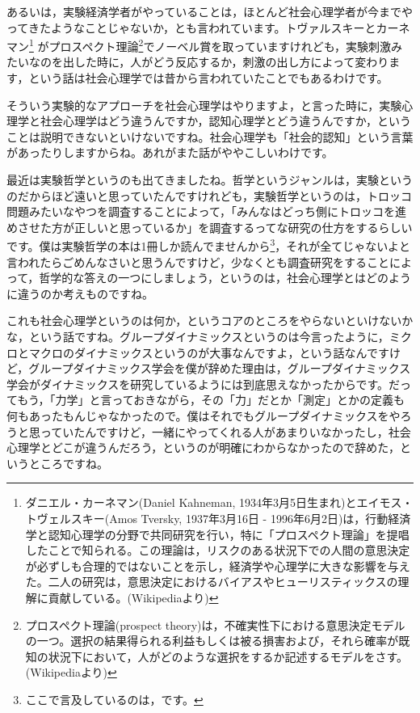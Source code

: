 \documentclass{ltjsbook}
\begin{document}
あるいは，実験経済学者がやっていることは，ほとんど社会心理学者が今までやってきたようなことじゃないか，とも言われています。トヴァルスキーとカーネマン\footnote{ダニエル・カーネマン(Daniel Kahneman, 1934年3月5日生まれ)とエイモス・トヴェルスキー(Amos Tversky, 1937年3月16日 - 1996年6月2日)は，行動経済学と認知心理学の分野で共同研究を行い，特に「プロスペクト理論」を提唱したことで知られる。この理論は，リスクのある状況下での人間の意思決定が必ずしも合理的ではないことを示し，経済学や心理学に大きな影響を与えた。二人の研究は，意思決定におけるバイアスやヒューリスティックスの理解に貢献している。(Wikipediaより)}
がプロスペクト理論\footnote{プロスペクト理論(prospect theory)は，不確実性下における意思決定モデルの一つ。選択の結果得られる利益もしくは被る損害および，それら確率が既知の状況下において，人がどのような選択をするか記述するモデルをさす。(Wikipediaより)}でノーベル賞を取っていますけれども，実験刺激みたいなのを出した時に，人がどう反応するか，刺激の出し方によって変わります，という話は社会心理学では昔から言われていたことでもあるわけです。

そういう実験的なアプローチを社会心理学はやりますよ，と言った時に，実験心理学と社会心理学はどう違うんですか，認知心理学とどう違うんですか，ということは説明できないといけないですね。社会心理学も「社会的認知」という言葉があったりしますからね。あれがまた話がややこしいわけです。

最近は実験哲学というのも出てきましたね。哲学というジャンルは，実験というのだからほど遠いと思っていたんですけれども，実験哲学というのは，トロッコ問題みたいなやつを調査することによって，「みんなはどっち側にトロッコを進めさせた方が正しいと思っているか」を調査するってな研究の仕方をするらしいです。僕は実験哲学の本は1冊しか読んでませんから\footnote{ここで言及しているのは，\textcite{SPjikkentetugaku}です。}，それが全てじゃないよと言われたらごめんなさいと思うんですけど，少なくとも調査研究をすることによって，哲学的な答えの一つにしましょう，というのは，社会心理学とはどのように違うのか考えものですね。

これも社会心理学というのは何か，というコアのところをやらないといけないかな，という話ですね。グループダイナミックスというのは今言ったように，ミクロとマクロのダイナミックスというのが大事なんですよ，という話なんですけど，グループダイナミックス学会を僕が辞めた理由は，グループダイナミックス学会がダイナミックスを研究しているようには到底思えなかったからです。だってもう，「力学」と言っておきながら，その「力」だとか「測定」とかの定義も何もあったもんじゃなかったので。僕はそれでもグループダイナミックスをやろうと思っていたんですけど，一緒にやってくれる人があまりいなかったし，社会心理学とどこが違うんだろう，というのが明確にわからなかったので辞めた，というところですね。
\end{document}
